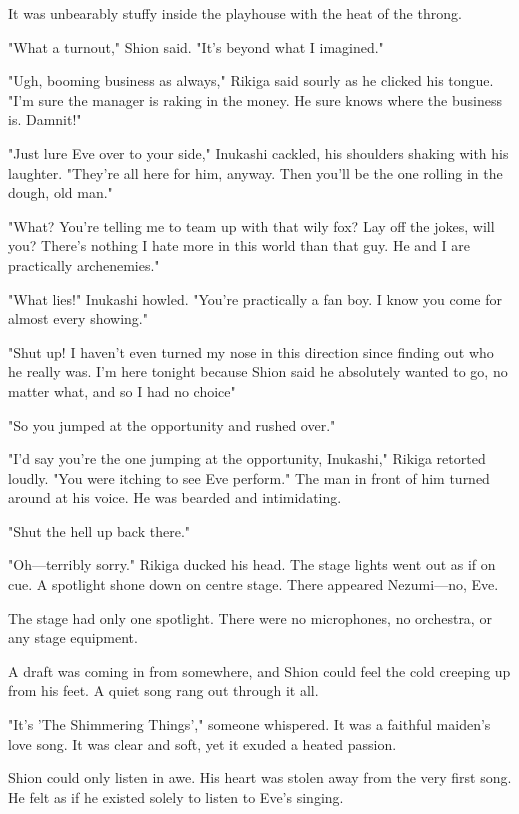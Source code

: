 \mybreak

It was unbearably stuffy inside the playhouse with the heat of the throng.

"What a turnout," Shion said. "It's beyond what I imagined."

"Ugh, booming business as always," Rikiga said sourly as he clicked his tongue. "I'm sure the manager is raking in the money. He sure knows where the business is. Damnit!"

"Just lure Eve over to your side," Inukashi cackled, his shoulders shaking with his laughter. "They're all here for him, anyway. Then you'll be the one rolling in the dough, old man."

"What? You're telling me to team up with that wily fox? Lay off the jokes, will you? There's nothing I hate more in this world than that guy. He and I are practically archenemies."

"What lies!" Inukashi howled. "You're practically a fan boy. I know you come for almost every showing."

"Shut up! I haven't even turned my nose in this direction since finding out who he really was. I'm here tonight because Shion said he absolutely wanted to go, no matter what, and so I had no choice\el "

"So you jumped at the opportunity and rushed over."

"I'd say you're the one jumping at the opportunity, Inukashi," Rikiga retorted loudly. "You were itching to see Eve perform." The man in front of him turned around at his voice. He was bearded and intimidating.

"Shut the hell up back there."

"Oh---terribly sorry." Rikiga ducked his head. The stage lights went out as if on cue. A spotlight shone down on centre stage. There appeared Nezumi---no, Eve.

The stage had only one spotlight. There were no microphones, no orchestra, or any stage equipment.

A draft was coming in from somewhere, and Shion could feel the cold creeping up from his feet. A quiet song rang out through it all.

"It's 'The Shimmering Things'," someone whispered. It was a faithful maiden's love song. It was clear and soft, yet it exuded a heated passion.

Shion could only listen in awe. His heart was stolen away from the very first song. He felt as if he existed solely to listen to Eve's singing.

